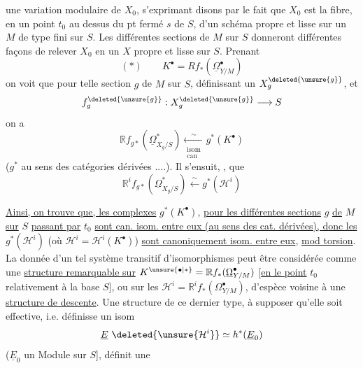 une  variation modulaire de $X_0$, s'exprimant disons par le fait que $X_0$ est la fibre, en un point $t_0$ au dessus du pt fermé $s$ de $S$, d'un schéma propre et lisse  sur un $M$ de type fini sur $S$.
Les différentes sections de $M$ sur $S$ donneront différentes façons de relever $X_0$ en un $X$ propre et lisse sur $S$. Prenant
\[
(*)\qquad K^\bullet=Rf_*(\underline{\Omega}^\bullet_{Y/M})
\]
on voit que pour  telle section $g$ de $M$ sur $S$, définissant un $X_g^{\deleted{\unsure{g}}}$, et
\[
f_g^{\deleted{\unsure{g}}}:X_g^{\deleted{\unsure{g}}}\longrightarrow S
\]
on a
\[
\mathbb{R}f_{g*}(\underline{\Omega}^*_{X_g/S})
\underset{\substack{\text{isom}\\\text{can}}}{\xleftarrow{\sim}}
g^*(K^\bullet)
\]
($g^*$ au sens des catégories dérivées ....). Il s'ensuit, , que
\[
\mathbb{R}^if_{g*}(\underline{\Omega}^*_{X_g/S})
\xleftarrow{\sim}g^*(\mathcal{H}^i)
\]

\uline{Ainsi, on trouve que,  les complexes} $g^*(K^\bullet)$, \uline{pour les différentes sections} $g$ \uline{de} $M$ \uline{sur} $S$ \uline{passant par} $t_0$ \uline{sont can. isom. entre eux (au sens des cat. dérivées), donc les} $g^*(\mathcal{H}^i)$
(où $\mathcal{H}^i=\mathcal{H}^i(K^\bullet)$)
\uline{sont canoniquement isom. entre eux},  \uline{mod torsion}.
La donnée d'un tel système transitif d'isomorphismes peut être considérée comme une \uline{structure remarquable sur} $K^{\unsure{\bullet|*}}=\mathbb{R}f_*(\underline{\Omega}^\bullet_{Y/M})$ [\uline{en le point} $t_0$ relativement à la base $S$], ou sur les $\mathcal{H}^i=\mathbb{R}^if_*(\Omega^\bullet_{Y/M})$,
d'espèce voisine à une \uline{structure de descente}.
Une structure de  ce dernier type,  à supposer qu'elle soit effective, i.e. définisse un isom
\[
\underline{E}\ \deleted{\unsure{\mathcal{H}^i}}\simeq h^*(\underline{E}_0)
\]
($\underline{E}_0$ un Module sur $S$], définit une


